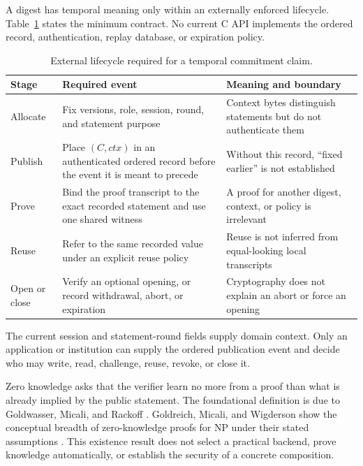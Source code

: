 A digest has temporal meaning only within an externally enforced lifecycle.
Table~\ref{tab:ttt-commitment-lifecycle} states the minimum contract. No current
C API implements the ordered record, authentication, replay database, or
expiration policy.

\begin{table}[H]
\centering
\small
\begin{tabular}{@{}
>{\raggedright\arraybackslash}p{}
>{\raggedright\arraybackslash}p{}
>{\raggedright\arraybackslash}p{}@{}}
\hline
Stage & Required event & Meaning and boundary \\
\hline
Allocate & Fix versions, role, session, round, and statement purpose & Context bytes distinguish statements but do not authenticate them \\
Publish & Place $(C,\mathit{ctx})$ in an authenticated ordered record before the event it is meant to precede & Without this record, ``fixed earlier'' is not established \\
Prove & Bind the proof transcript to the exact recorded statement and use one shared witness & A proof for another digest, context, or policy is irrelevant \\
Reuse & Refer to the same recorded value under an explicit reuse policy & Reuse is not inferred from equal-looking local transcripts \\
Open or close & Verify an optional opening, or record withdrawal, abort, or expiration & Cryptography does not explain an abort or force an opening \\
\hline
\end{tabular}
\caption{External lifecycle required for a temporal commitment claim.}
\label{tab:ttt-commitment-lifecycle}
\end{table}

The current session and statement-round fields supply domain context. Only an
application or institution can supply the ordered publication event and decide
who may write, read, challenge, reuse, revoke, or close it.

Zero knowledge asks that the verifier learn no more from a proof than what is
already implied by the public statement. The foundational definition is due
to Goldwasser, Micali, and Rackoff
\cite{goldwasser1989knowledgecomplexity}. Goldreich, Micali, and Wigderson show
the conceptual breadth of zero-knowledge proofs for NP under their stated
assumptions \cite{goldreich1991proofsvalidity}. This existence result does not
select a practical backend, prove knowledge automatically, or establish the
security of a concrete composition.

